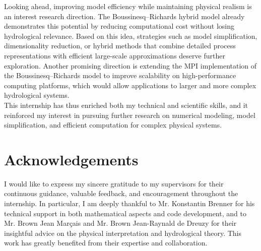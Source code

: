 \documentclass[12pt,a4paper]{article}
\begin{document}
Looking ahead, improving model efficiency while maintaining physical realism is an interest research direction.
The Boussinesq–Richards hybrid model already demonstrates this potential by reducing computational cost without losing hydrological relevance.
Based on this idea, strategies such as model simplification, dimensionality reduction, or hybrid methods that combine detailed process representations with efficient large-scale approximations deserve further exploration.
Another promising direction is extending the MPI implementation of the Boussinesq–Richards model to improve scalability on high-performance computing platforms, which would allow applications to larger and more complex hydrological systems.\\

This internship has thus enriched both my technical and scientific skills, and it reinforced my interest in pursuing further research on numerical modeling, model simplification, and efficient computation for complex physical systems.












\section{Acknowledgements}  
I would like to express my sincere gratitude to my supervisors for their continuous guidance, valuable feedback, and encouragement throughout the internship.  
In particular, I am deeply thankful to Mr. Konstantin Brenner for his technical support in both mathematical aspects and code development, and to Mr. Brown Jean Marçais and Mr. Brown Jean-Raynald de Dreuzy for their insightful advice on the physical interpretation and hydrological theory.  
This work has greatly benefited from their expertise and collaboration.  






\newpage


\end{document}
